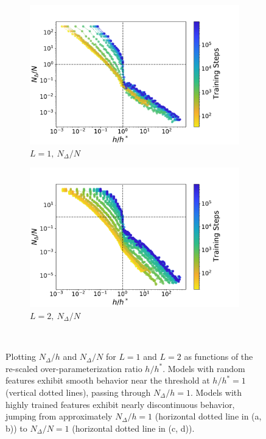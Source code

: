 \documentclass[11pt]{article}
\begin{document}
\begin{figure}[!h]
{\begin{subfigure}{.7\textwidth}
      \includegraphics[width=\linewidth]{docs/assets/h_h_star_vs_N_del_N_L=1.pdf}
      \caption{$L=1, \ N_\Delta/N$}
    \end{subfigure}%
    \begin{subfigure}{.7\textwidth}
      \centering
      \includegraphics[width=\linewidth]{docs/assets/h_h_star_vs_N_del_N_L=2.pdf}
      \caption{$L=2, \ N_\Delta/N$}
    \end{subfigure}
}\\
\caption{Plotting $N_\Delta/h$ and $N_\Delta/N$ for $L=1$ and $L=2$ as functions of the re-scaled over-parameterization ratio $h/h^*$. Models with random features exhibit smooth behavior near the threshold at $h/h^*=1$ (vertical dotted lines), passing through $N_\Delta/h=1$. Models with highly trained features exhibit nearly discontinuous behavior, jumping from approximately $N_\Delta/h=1$ (horizontal dotted line in (a, b)) to $N_\Delta/N=1$ (horizontal dotted line in (c, d)).}
\label{N_del_discontinuity}
\end{figure}
\end{document}
